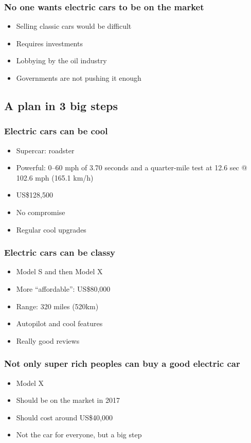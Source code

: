 \begin{frame}
\frametitle{No one wants electric cars to be on the market}
\begin{itemize}
    \itemsep1.5em
    \item Selling classic cars would be difficult %
    \item Requires investments
    \item Lobbying by the oil industry
    \item Governments are not pushing it enough
\end{itemize}
\end{frame}


\subsection{A plan in 3 big steps}

\begin{frame}
\frametitle{Electric cars can be cool}
\begin{itemize}
    \itemsep1.5em
    \item Supercar: roadster
    \item Powerful: 0–60 mph of 3.70 seconds and a quarter-mile test at 12.6 sec @ 102.6 mph (165.1 km/h)
    \item US\$128,500
    \item No compromise
    \item Regular cool upgrades
\end{itemize}
\end{frame}


\begin{frame}
\frametitle{Electric cars can be classy}
\begin{itemize}
    \itemsep1.5em
    \item Model S and then Model X
    \item More ``affordable'': US\$80,000
    \item Range: 320 miles (520km)
    \item Autopilot and cool features
    \item Really good reviews
\end{itemize}
\end{frame}


\begin{frame}
\frametitle{Not only super rich peoples can buy a good electric car}
\begin{itemize}
    \itemsep1.5em
    \item Model X
    \item Should be on the market in 2017
    \item Should cost around US\$40,000
    \item Not the car for everyone, but a big step
\end{itemize}
\end{frame}
